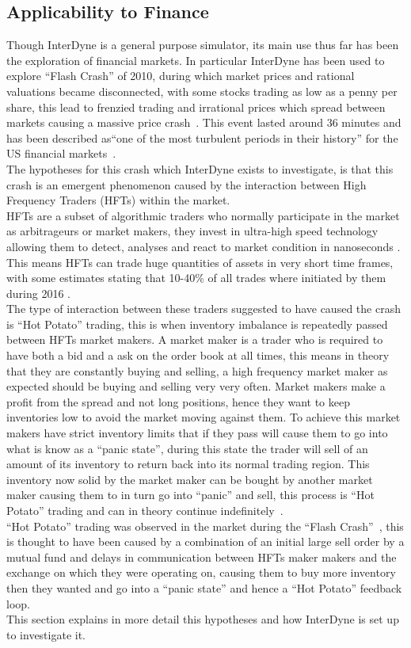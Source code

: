 \documentclass{article}
\begin{document}
\subsection{Applicability to Finance}
Though InterDyne is a general purpose simulator, its main use thus far has been the exploration of financial markets. In particular InterDyne has been used to explore ``Flash Crash'' of 2010, during which market prices and rational valuations became disconnected, with some stocks trading as low as a penny per share, this lead to frenzied trading and irrational prices which spread between markets causing a massive price crash~\cite{SECreport_delays}. This event lasted around 36 minutes and has been described as``one of the most turbulent periods in their history'' for the US financial markets~\cite{Impact_hft}.\\
The hypotheses for this crash which InterDyne exists to investigate, is that this crash is an emergent phenomenon caused by the interaction between High Frequency Traders (HFTs) within the market.\\
HFTs are a subset of algorithmic traders who normally participate in the market as arbitrageurs or market makers, they invest in ultra-high speed technology allowing them to detect, analyses and react to market condition in nanoseconds \cite{hftinformation1}. This means HFTs can trade huge quantities of assets in very short time frames, with some estimates stating that 10-40\% of all trades where initiated by them during 2016 \cite{hftmarketparticipation}.\\
The type of interaction between these traders suggested to have caused the crash is ``Hot Potato'' trading, this is when inventory imbalance is repeatedly passed between HFTs market makers. A market maker is a trader who is required to have both a bid and a ask on the order book at all times, this means in theory that they are constantly buying and selling, a high frequency market maker as expected should be buying and selling very very often. Market makers make a profit from the spread and not long positions, hence they want to keep inventories low to avoid the market moving against them. To achieve this market makers have strict inventory limits that if they pass will cause them to go into what is know as a ``panic state'', during this state the trader will sell of an amount of its inventory to return back into its normal trading region. This inventory now solid by the market maker can be bought by another market maker causing them to in turn go into ``panic'' and sell, this process is ``Hot Potato'' trading and can in theory continue indefinitely~\cite{Elias_Paper}.\\
``Hot Potato'' trading was observed in the market during the ``Flash Crash''~\cite{SECreport_delays}, this is thought to have been caused by a combination of an initial large sell order by a mutual fund and delays in communication between HFTs maker makers and the exchange on which they were operating on, causing them to buy more inventory then they wanted and go into a ``panic state'' and hence a ``Hot Potato'' feedback loop.\\       %
This section explains in more detail this hypotheses and how InterDyne is set up to investigate it.  
\end{document}
